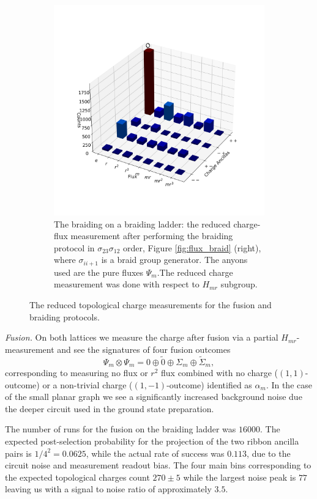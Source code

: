 \documentclass[two column]{article}
\begin{document}
\begin{figure}
\begin{subfigure}{0.47\textwidth}
    \includegraphics[width=\linewidth]{Figures/braid_link.png}
    \caption{The braiding on a braiding ladder: the reduced charge-flux measurement after performing the braiding protocol in $\sigma_{23}\sigma_{12}$ order, Figure \ref{fig:flux_braid} (right), where $\sigma_{ii+1}$ is a braid group generator. The anyons used are the pure fluxes $\Psi_m$.The reduced charge measurement was done with respect to $H_{mr}$ subgroup.}
    \label{fig:braid_link}
\end{subfigure}
\caption{The reduced topological charge measurements for the fusion and braiding protocols.}
\label{fig:red_charge_res}
\end{figure}

\emph{Fusion.} 
On both lattices we measure the charge after fusion via a partial $H_{mr}$-measurement and see the signatures of four fusion outcomes
$$\Psi_m \otimes \Psi_m = 0 \oplus \tilde 0 \oplus \Sigma_m \oplus \tilde{\Sigma}_m,$$
corresponding to measuring no flux or $r^2$ flux combined with no charge ($(1,1)$-outcome) or a non-trivial charge ($(1,-1)$-outcome) identified as $\alpha_m$.
In the case of the small planar graph we see a significantly 
increased background noise due the deeper circuit used in the ground state preparation.

The number of runs for the fusion on the braiding ladder was $16000$. The expected post-selection probability for the projection of the two ribbon ancilla pairs is $1/4^2=0.0625$, while the actual rate of success was $0.113$, due to the circuit noise and measurement readout bias. The four main bins corresponding to the expected topological charges count $270\pm5$ while the largest noise peak is $77$ leaving us with a signal to noise ratio of approximately $3.5$. 
\end{document}
